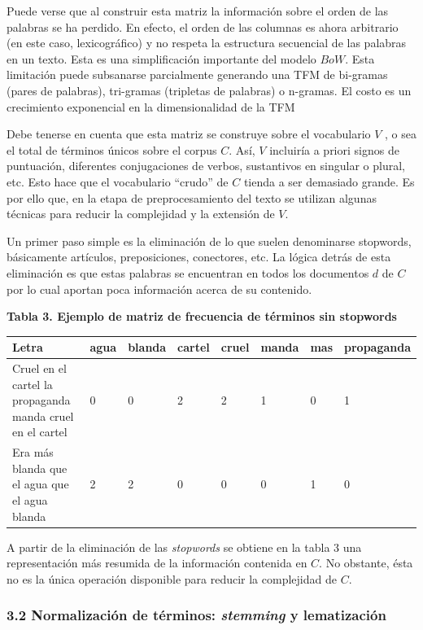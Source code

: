 \documentclass[]{article}
\begin{document}
Puede verse que al construir esta matriz la información sobre el orden
de las palabras se ha perdido. En efecto, el orden de las columnas es
ahora arbitrario (en este caso, lexicográfico) y no respeta la
estructura secuencial de las palabras en un texto. Esta es una
simplificación importante del modelo \(BoW\). Esta limitación puede
subsanarse parcialmente generando una TFM de bi-gramas (pares de
palabras), tri-gramas (tripletas de palabras) o n-gramas. El costo es un
crecimiento exponencial en la dimensionalidad de la TFM

Debe tenerse en cuenta que esta matriz se construye sobre el vocabulario
\(V\) , o sea el total de términos únicos sobre el corpus \(C\). Así,
\(V\) incluiría a priori signos de puntuación, diferentes conjugaciones
de verbos, sustantivos en singular o plural, etc. Esto hace que el
vocabulario ``crudo'' de \(C\) tienda a ser demasiado grande. Es por
ello que, en la etapa de preprocesamiento del texto se utilizan algunas
técnicas para reducir la complejidad y la extensión de \(V\).

Un primer paso simple es la eliminación de lo que suelen denominarse
stopwords, básicamente artículos, preposiciones, conectores, etc. La
lógica detrás de esta eliminación es que estas palabras se encuentran en
todos los documentos \(d\) de \(C\) por lo cual aportan poca información
acerca de su contenido.

\textbf{Tabla 3. Ejemplo de matriz de frecuencia de términos sin
stopwords}

\begin{longtable}[]{@{}llllllll@{}}
\toprule
Letra & agua & blanda & cartel & cruel & manda & mas &
propaganda\tabularnewline
\midrule
\endhead
Cruel en el cartel la propaganda manda cruel en el cartel & 0 & 0 & 2 &
2 & 1 & 0 & 1\tabularnewline
Era más blanda que el agua que el agua blanda & 2 & 2 & 0 & 0 & 0 & 1 &
0\tabularnewline
\bottomrule
\end{longtable}

A partir de la eliminación de las \emph{stopwords} se obtiene en la
tabla 3 una representación más resumida de la información contenida en
\(C\). No obstante, ésta no es la única operación disponible para
reducir la complejidad de \(C\).

\subsubsection{\texorpdfstring{3.2 Normalización de términos:
\emph{stemming} y
lematización}{3.2 Normalización de términos: stemming y lematización}}\label{normalizaciuxf3n-de-tuxe9rminos-stemming-y-lematizaciuxf3n}
\end{document}
